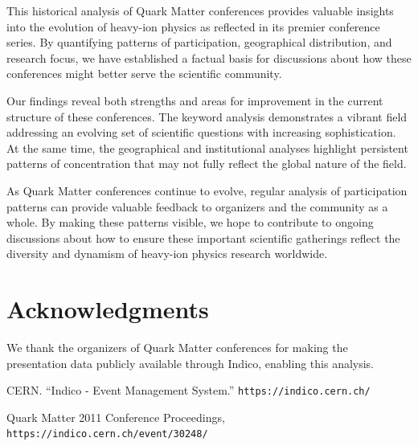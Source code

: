\documentclass[a4paper,11pt]{article}
\begin{document}
This historical analysis of Quark Matter conferences provides valuable insights into the evolution of heavy-ion physics as reflected in its premier conference series. By quantifying patterns of participation, geographical distribution, and research focus, we have established a factual basis for discussions about how these conferences might better serve the scientific community.

Our findings reveal both strengths and areas for improvement in the current structure of these conferences. The keyword analysis demonstrates a vibrant field addressing an evolving set of scientific questions with increasing sophistication. At the same time, the geographical and institutional analyses highlight persistent patterns of concentration that may not fully reflect the global nature of the field.

As Quark Matter conferences continue to evolve, regular analysis of participation patterns can provide valuable feedback to organizers and the community as a whole. By making these patterns visible, we hope to contribute to ongoing discussions about how to ensure these important scientific gatherings reflect the diversity and dynamism of heavy-ion physics research worldwide.

\section{Acknowledgments}

We thank the organizers of Quark Matter conferences for making the presentation data publicly available through Indico, enabling this analysis.


\begin{thebibliography}{9}
CERN. ``Indico - Event Management System.'' 
\texttt{https://indico.cern.ch/}

Quark Matter 2011 Conference Proceedings,
\texttt{https://indico.cern.ch/event/30248/}

\end{thebibliography}
\end{document}

